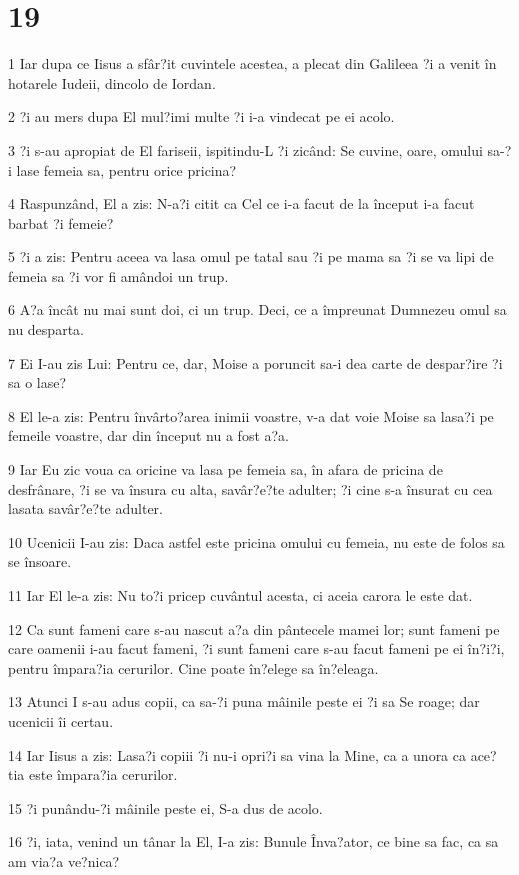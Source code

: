 \chapter{19}

\par 1 Iar dupa ce Iisus a sfâr?it cuvintele acestea, a plecat din Galileea ?i a venit în hotarele Iudeii, dincolo de Iordan.
\par 2 ?i au mers dupa El mul?imi multe ?i i-a vindecat pe ei acolo.
\par 3 ?i s-au apropiat de El fariseii, ispitindu-L ?i zicând: Se cuvine, oare, omului sa-?i lase femeia sa, pentru orice pricina?
\par 4 Raspunzând, El a zis: N-a?i citit ca Cel ce i-a facut de la început i-a facut barbat ?i femeie?
\par 5 ?i a zis: Pentru aceea va lasa omul pe tatal sau ?i pe mama sa ?i se va lipi de femeia sa ?i vor fi amândoi un trup.
\par 6 A?a încât nu mai sunt doi, ci un trup. Deci, ce a împreunat Dumnezeu omul sa nu desparta.
\par 7 Ei I-au zis Lui: Pentru ce, dar, Moise a poruncit sa-i dea carte de despar?ire ?i sa o lase?
\par 8 El le-a zis: Pentru învârto?area inimii voastre, v-a dat voie Moise sa lasa?i pe femeile voastre, dar din început nu a fost a?a.
\par 9 Iar Eu zic voua ca oricine va lasa pe femeia sa, în afara de pricina de desfrânare, ?i se va însura cu alta, savâr?e?te adulter; ?i cine s-a însurat cu cea lasata savâr?e?te adulter.
\par 10 Ucenicii I-au zis: Daca astfel este pricina omului cu femeia, nu este de folos sa se însoare.
\par 11 Iar El le-a zis: Nu to?i pricep cuvântul acesta, ci aceia carora le este dat.
\par 12 Ca sunt fameni care s-au nascut a?a din pântecele mamei lor; sunt fameni pe care oamenii i-au facut fameni, ?i sunt fameni care s-au facut fameni pe ei în?i?i, pentru împara?ia cerurilor. Cine poate în?elege sa în?eleaga.
\par 13 Atunci I s-au adus copii, ca sa-?i puna mâinile peste ei ?i sa Se roage; dar ucenicii îi certau.
\par 14 Iar Iisus a zis: Lasa?i copiii ?i nu-i opri?i sa vina la Mine, ca a unora ca ace?tia este împara?ia cerurilor.
\par 15 ?i punându-?i mâinile peste ei, S-a dus de acolo.
\par 16 ?i, iata, venind un tânar la El, I-a zis: Bunule Înva?ator, ce bine sa fac, ca sa am via?a ve?nica?
